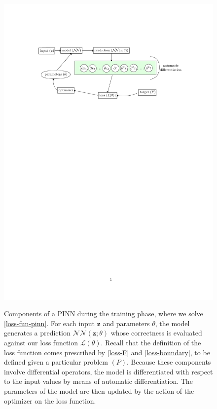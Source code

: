 \documentclass[12pt]{report} %
\newcommand{\tmmathbf}[1]{\ensuremath{\boldsymbol{#1}}}
\begin{document}
\begin{figure}[ht]
    \centering
    {\includegraphics[width=\textwidth, clip=true, trim={3cm 20cm 3cm 4cm}]{imagenes/autodiffgraph.pdf}}
    \caption{Components of a PINN during the training phase, where we solve \eqref{loss-fun-pinn}. For each input $\tmmathbf{z}$ and parameters $\theta$, the model generates a prediction $\mathcal{NN}(\tmmathbf{z};\theta)$ whose correctness is evaluated against our loss function $\mathcal{L}(\theta)$. Recall that the definition of the loss function comes prescribed by \eqref{loss-F} and \eqref{loss-boundary}, to be defined given a particular problem $(P)$. Because these components involve differential operators, the model is differentiated with respect to the input values by means of automatic differentiation. The parameters of the model are then updated by the action of the optimizer on the loss function. %
    }
    \label{fig:autodiffgraph}
\end{figure}
\end{document}
